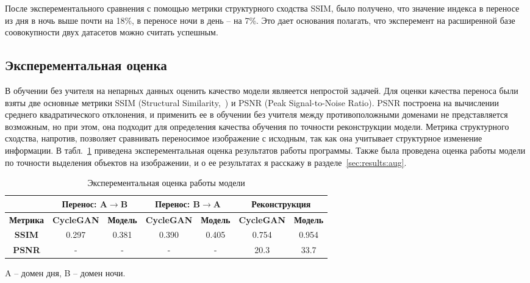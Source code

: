 \documentclass[11pt,a4paper]{extarticle}
\begin{document}
{			\noindent
			После эксперементального сравнения с помощью метрики структурного сходства SSIM, было получено, что значение индекса в переносе из дня в ночь выше почти на 18\%, в переносе ночи в день -- на 7\%.
			Это дает основания полагать, что эксперемент на расширенной базе соовокупности двух датасетов можно считать успешным.


	\subsection{Эксперементальная оценка}\label{sec:eval}

		В обучении без учителя на непарных данных оценить качество модели являеется непростой задачей.
		Для оценки качества переноса были взяты две основные метрики SSIM (Structural Similarity,~\cite{metric:ssim}) и PSNR (Peak Signal-to-Noise Ratio).
		PSNR построена на вычислении среднего квадратического отклонения, и применить ее в обучении без учителя между противоположными доменами не представляется возможным, но при этом, она подходит для определения качества обучения по точности реконструкции модели.
		Метрика структурного сходства, напротив, позволяет сравнивать переносимое изображение с исходным, так как она учитывает структурное изменение информации.
		В табл.~\ref{tab:metrics} приведена эксперементальная оценка результатов работы программы.
		Также была проведена оценка работы модели по точности выделения объектов на изображении, и о ее результатах я расскажу в разделе~\ref{sec:results:aug}.

		\begin{table}[ht]
			\centering
			\begin{tabular}{|c|c|c|c|c|c|c|}
				\hline
				\rowcolor[HTML]{EFEFEF} 
														& \multicolumn{2}{c|}{\cellcolor[HTML]{EFEFEF}\textbf{Перенос: A$\rightarrow$B}} & \multicolumn{2}{c|}{\cellcolor[HTML]{EFEFEF}\textbf{Перенос: B$\rightarrow$A}} & \multicolumn{2}{c|}{\cellcolor[HTML]{EFEFEF}\textbf{Реконструкция}} \\ \hline
				\rowcolor[HTML]{EFEFEF} 
				{\color[HTML]{9A0000} \textbf{Метрика}} & \textbf{CycleGAN}                       & \textbf{Модель}                      & \textbf{CycleGAN}                       & \textbf{Модель}                      & \textbf{CycleGAN}                 & \textbf{Модель}                 \\ \hline
				\cellcolor[HTML]{EFEFEF}\textbf{SSIM}   & 0.297                                   & 0.381                                & 0.390                                   & 0.405                                & 0.754                             & 0.954                           \\ \hline
				\cellcolor[HTML]{EFEFEF}\textbf{PSNR}   & -                                       & -                                    & -                                       & -                                    & 20.3                              & 33.7                            \\ \hline
				\end{tabular}
			\caption{Эксперементальная оценка работы модели}{
				\small{
					A -- домен дня, B -- домен ночи.
				}
			}
			\label{tab:metrics}
		\end{table}
		
}
\end{document}
